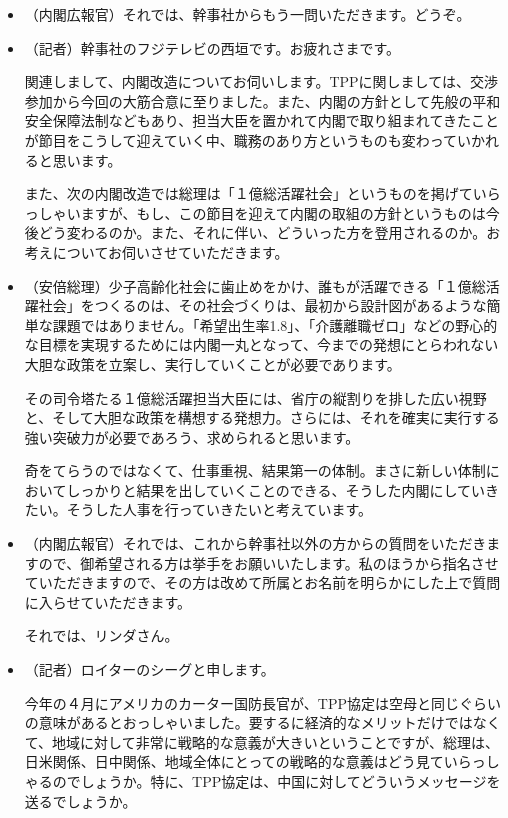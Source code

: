 \begin {itemize}
  今後、どのような具体的影響が生じ得るかを十分に精査していきます。その上でTPP協定の締結について、国会の承認を求めるまでの間に政府全体で責任を持って国内対策を取りまとめ、交渉で獲得した措置と併せて万全の措置を講じていく考えであります。\par
\item （内閣広報官）それでは、幹事社からもう一問いただきます。どうぞ。\par
\item （記者）幹事社のフジテレビの西垣です。お疲れさまです。\par
  関連しまして、内閣改造についてお伺いします。TPPに関しましては、交渉参加から今回の大筋合意に至りました。また、内閣の方針として先般の平和安全保障法制などもあり、担当大臣を置かれて内閣で取り組まれてきたことが節目をこうして迎えていく中、職務のあり方というものも変わっていかれると思います。\par
  また、次の内閣改造では総理は「１億総活躍社会」というものを掲げていらっしゃいますが、もし、この節目を迎えて内閣の取組の方針というものは今後どう変わるのか。また、それに伴い、どういった方を登用されるのか。お考えについてお伺いさせていただきます。\par
\item （安倍総理）少子高齢化社会に歯止めをかけ、誰もが活躍できる「１億総活躍社会」をつくるのは、その社会づくりは、最初から設計図があるような簡単な課題ではありません。「希望出生率1.8」、「介護離職ゼロ」などの野心的な目標を実現するためには内閣一丸となって、今までの発想にとらわれない大胆な政策を立案し、実行していくことが必要であります。\par
  その司令塔たる１億総活躍担当大臣には、省庁の縦割りを排した広い視野と、そして大胆な政策を構想する発想力。さらには、それを確実に実行する強い突破力が必要であろう、求められると思います。\par
  奇をてらうのではなくて、仕事重視、結果第一の体制。まさに新しい体制においてしっかりと結果を出していくことのできる、そうした内閣にしていきたい。そうした人事を行っていきたいと考えています。\par
\item （内閣広報官）それでは、これから幹事社以外の方からの質問をいただきますので、御希望される方は挙手をお願いいたします。私のほうから指名させていただきますので、その方は改めて所属とお名前を明らかにした上で質問に入らせていただきます。\par
  それでは、リンダさん。\par
\item （記者）ロイターのシーグと申します。\par
  今年の４月にアメリカのカーター国防長官が、TPP協定は空母と同じぐらいの意味があるとおっしゃいました。要するに経済的なメリットだけではなくて、地域に対して非常に戦略的な意義が大きいということですが、総理は、日米関係、日中関係、地域全体にとっての戦略的な意義はどう見ていらっしゃるのでしょうか。特に、TPP協定は、中国に対してどういうメッセージを送るでしょうか。\par

\end{itemize}
